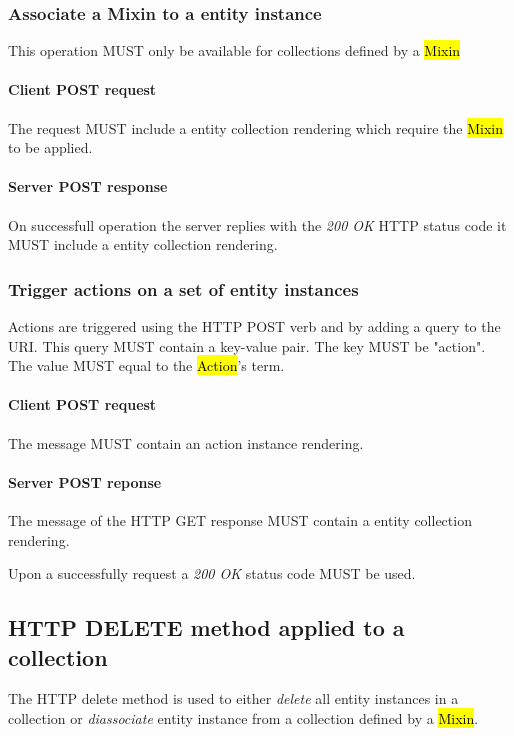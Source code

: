 \documentclass[10pt,a4paper]{article}
\begin{document}
\subsubsection{Associate a Mixin to a entity instance}
This operation MUST only be available for collections defined by a \hl{Mixin}

\paragraph{Client POST request}
The request MUST include a entity collection rendering which require the \hl{Mixin} to be applied.

\paragraph{Server POST response}
On successfull operation the server replies with the \emph{200 OK} HTTP status code it MUST include a entity collection rendering.

\subsubsection{Trigger actions on a set of entity instances}
Actions are triggered using the HTTP POST verb and by adding a query to the URI. This query MUST contain a key-value pair. The key MUST be "action". The value MUST equal to the \hl{Action}'s term.

\paragraph{Client POST request}
The message MUST contain an action instance rendering.

\paragraph{Server POST reponse}
The message of the HTTP GET response MUST contain a entity collection rendering.

Upon a successfully request a \emph{200 OK} status code MUST be used.

\subsection{HTTP DELETE method applied to a collection}
The HTTP delete method is used to either {\em delete} all entity instances in a collection or {\em diassociate} entity instance from a collection defined by a \hl{Mixin}.
\end{document}
